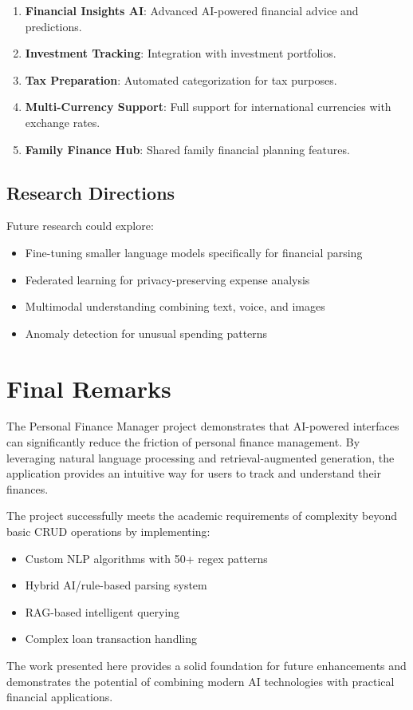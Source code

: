 \begin{enumerate}
    \item \textbf{Financial Insights AI}: Advanced AI-powered financial advice and predictions.
    
    \item \textbf{Investment Tracking}: Integration with investment portfolios.
    
    \item \textbf{Tax Preparation}: Automated categorization for tax purposes.
    
    \item \textbf{Multi-Currency Support}: Full support for international currencies with exchange rates.
    
    \item \textbf{Family Finance Hub}: Shared family financial planning features.
\end{enumerate}

\subsection{Research Directions}

Future research could explore:

\begin{itemize}
    \item Fine-tuning smaller language models specifically for financial parsing
    \item Federated learning for privacy-preserving expense analysis
    \item Multimodal understanding combining text, voice, and images
    \item Anomaly detection for unusual spending patterns
\end{itemize}

\section{Final Remarks}

The Personal Finance Manager project demonstrates that AI-powered interfaces can significantly reduce the friction of personal finance management. By leveraging natural language processing and retrieval-augmented generation, the application provides an intuitive way for users to track and understand their finances.

The project successfully meets the academic requirements of complexity beyond basic CRUD operations by implementing:

\begin{itemize}
    \item Custom NLP algorithms with 50+ regex patterns
    \item Hybrid AI/rule-based parsing system
    \item RAG-based intelligent querying
    \item Complex loan transaction handling
\end{itemize}

The work presented here provides a solid foundation for future enhancements and demonstrates the potential of combining modern AI technologies with practical financial applications.
